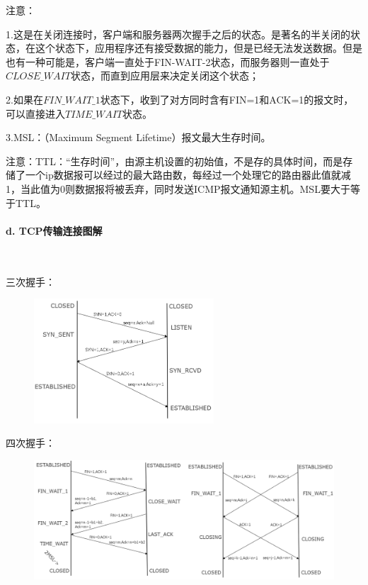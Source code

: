 \documentclass[UTF8]{article}%
\begin{document}
注意：

1.这是在关闭连接时，客户端和服务器两次握手之后的状态。是著名的半关闭的状态，在这个状态下，应用程序还有接受数据的能力，但是已经无法发送数据。但是也有一种可能是，客户端一直处于FIN-WAIT-2状态，而服务器则一直处于$CLOSE\_WAIT$状态，而直到应用层来决定关闭这个状态；

2.如果在$FIN\_WAIT\_1$状态下，收到了对方同时含有FIN=1和ACK=1的报文时，可以直接进入$TIME\_WAIT$状态。

3.MSL：（Maximum Segment Lifetime）报文最大生存时间。

注意：TTL：“生存时间”，由源主机设置的初始值，不是存的具体时间，而是存储了一个ip数据报可以经过的最大路由数，每经过一个处理它的路由器此值就减1，当此值为0则数据报将被丢弃，同时发送ICMP报文通知源主机。MSL要大于等于TTL。

\paragraph{d. TCP传输连接图解}~{}

三次握手：

\begin{figure}[htb!]%
    \includegraphics[width=0.6\textwidth]{2.3-2.png}
    \label{fig::6}
\end{figure}

四次握手：

\begin{figure}[htb!]%
    \includegraphics[width=1.1\textwidth]{2.3-3.png}
    \label{fig::7}
\end{figure}
\end{document}
